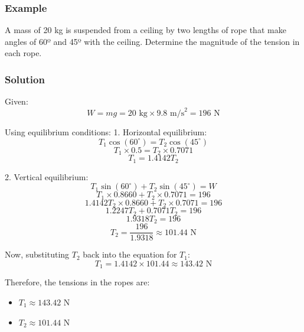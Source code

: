 \documentclass{article}
\begin{document}
\subsubsection*{Example}
A mass of 20 kg is suspended from a ceiling by two lengths of rope that make angles of 60º and 45º with the ceiling. Determine the magnitude of the tension in each rope.


\subsubsection*{Solution}

Given:
\[
W = mg = 20 \text{ kg} \times 9.8 \text{ m/s}^2 = 196 \text{ N}
\]

Using equilibrium conditions:
1. Horizontal equilibrium:
\[
T_1 \cos(60^\circ) = T_2 \cos(45^\circ)
\]
\[
T_1 \times 0.5 = T_2 \times 0.7071
\]
\[
T_1 = 1.4142 T_2
\]

2. Vertical equilibrium:
\[
T_1 \sin(60^\circ) + T_2 \sin(45^\circ) = W
\]
\[
T_1 \times 0.8660 + T_2 \times 0.7071 = 196
\]
\[
1.4142 T_2 \times 0.8660 + T_2 \times 0.7071 = 196
\]
\[
1.2247 T_2 + 0.7071 T_2 = 196
\]
\[
1.9318 T_2 = 196
\]
\[
T_2 = \frac{196}{1.9318} \approx 101.44 \text{ N}
\]

Now, substituting \( T_2 \) back into the equation for \( T_1 \):
\[
T_1 = 1.4142 \times 101.44 \approx 143.42 \text{ N}
\]

Therefore, the tensions in the ropes are:
\begin{itemize}
    \item \( T_1 \approx 143.42 \text{ N} \)
    \item \( T_2 \approx 101.44 \text{ N} \)
\end{itemize}
\end{document}
